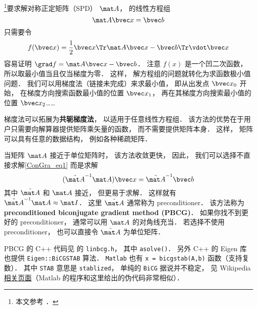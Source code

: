 
\begin{issues}
\issueDraft
\end{issues}


\footnote{本文参考 \cite{NR3}．}要求解对称正定矩阵（SPD） $\mat A$， 的线性方程组
\begin{equation}\label{ConGra_eq1}
\mat A \bvec x = \bvec b
\end{equation}
只需要令
\begin{equation}
f(\bvec x) = \frac{1}{2}\bvec x\Tr \mat A\bvec x - \bvec b\Tr \vdot \bvec x
\end{equation}
容易证明 $\grad f = \mat A \bvec x - \bvec b$． 注意 $f(x)$ 是一个凹二次函数， 所以取最小值当且仅当梯度为零． 这样， 解方程组的问题就转化为求函数极小值问题． 我们可以用梯度法（链接未完成）来求最小值， 即从出发点 $\bvec x_0$ 开始， 在梯度方向搜索函数最小值的位置 $\bvec x_1$， 再在其梯度方向搜索最小值的位置 $\bvec x_2$……

梯度法可以拓展为\textbf{共轭梯度法}， 以适用于任意线性方程组． 该方法的优势在于用户只需要向解算器提供矩阵乘矢量的函数， 而不需要提供矩阵本身． 这样， 矩阵可以具有任意的数据结构， 例如各种稀疏矩阵．

当矩阵 $\mat A$ 接近于单位矩阵时， 该方法收敛更快， 因此， 我们可以选择不直接求解\autoref{ConGra_eq1} 而是求解
\begin{equation}
(\tilde {\mat A}^{-1}\mat A) \bvec x = \tilde {\mat A}^{-1}\bvec b
\end{equation}
其中 $\tilde {\mat A}$ 和 $\mat A$ 接近， 但更易于求解． 这样就有 $\tilde {\mat A}^{-1}\mat A \approx \mat I$． 这里 $\tilde {\mat A}$ 通常称为 preconditioner． 该方法称为 \textbf{preconditioned biconjugate gradient method (PBCG)}． 如果你找不到更好的 preconditioner， 通常可以用 $\mat A$ 的对角线充当． 若选择不使用 preconditioner， 也可以直接令 $\tilde {\mat A}$ 为单位矩阵．

PBCG 的 C++ 代码见 \cite{NR3} 的 \verb|linbcg.h|， 其中 \verb|asolve()|． 另外 C++ 的 Eigen 库也提供 \verb|Eigen::BiCGSTAB| 算法． \verb|Matlab| 也有 \verb|x = bicgstab(A,b)| 函数（支持复数）． 其中 \verb|STAB| 意思是 \verb|stablized|， 单纯的 \verb|BiCG| 据说并不稳定， 见 Wikipedia \href{https://en.wikipedia.org/wiki/Biconjugate_gradient_stabilized_method}{相关页面}（Matlab 的程序和这里给出的伪代码非常相似）．
